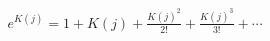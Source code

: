 \documentclass[preview]{standalone}
\begin{document}
\begin{align*}
e^{K(j)} = 1 + K(j) + \frac{K(j)^2}{2!} + \frac{K(j)^3}{3!} + \cdots
\end{align*}
\end{document}
